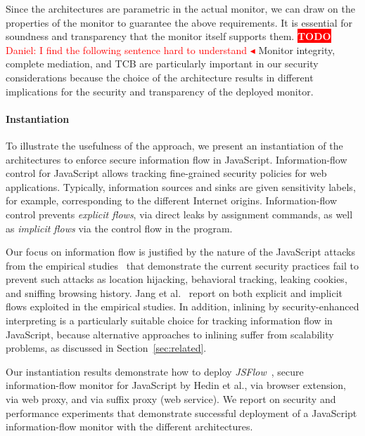 \documentclass{llncs}
\newcommand{\todo}[1]{\colorbox{red}{\textcolor{white}{\sffamily\bfseries\scriptsize TODO}} \textcolor{red}{#1} \textcolor{red}{$\blacktriangleleft$}}
\begin{document}
Since the architectures are parametric in the actual monitor, we can
draw on the properties of the monitor to guarantee the
above requirements. It is essential for soundness and
transparency that the monitor itself supports them. 
\todo{Daniel: I find the following sentence hard to understand}
Monitor integrity,
complete mediation, and TCB are particularly important in our security
considerations because the choice of the architecture results in
different implications for the security and transparency of the
deployed monitor.

\paragraph{Instantiation}
To illustrate the usefulness of the approach, we present an
instantiation of the architectures to enforce secure information flow
in JavaScript. Information-flow control for JavaScript allows tracking
fine-grained security policies for web applications. Typically,
information sources  and sinks are given sensitivity labels, for
example, corresponding to the different Internet origins.
Information-flow control prevents \emph{explicit flows}, via
direct leaks by assignment commands, as well as
\emph{implicit flows} via the control flow in the program.

Our focus on information flow is justified by
the nature of the JavaScript attacks from the empirical
studies~\cite{Jang+:CCS10,Nikiforakis+:CCS12} that demonstrate the current security
practices fail to  prevent such attacks as
location
hijacking, behavioral tracking, leaking cookies, and sniffing browsing
history. Jang et al.~\cite{Jang+:CCS10} report on both explicit and
implicit flows exploited in the empirical studies.
%
In addition, inlining by security-enhanced interpreting is a
particularly suitable choice for tracking information flow in
JavaScript, because alternative approaches to inlining suffer from
scalability problems, as discussed in Section~\ref{sec:related}. 

Our instantiation results demonstrate how to deploy
\emph{JSFlow}~\cite{Hedin:Sabelfeld:CSF12,JSFlow}, secure information-flow
monitor for JavaScript by Hedin et al., via
browser extension, via web proxy, and via suffix proxy (web service).
%
We report on security and performance experiments that demonstrate successful deployment of a JavaScript
information-flow monitor with the different architectures.


\end{document}
